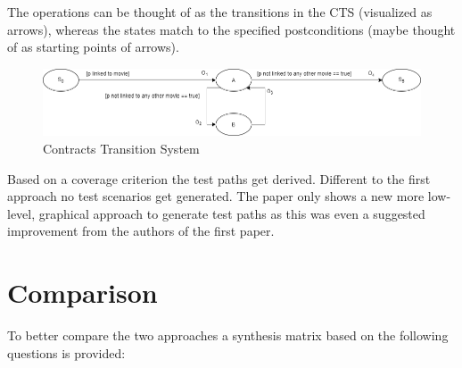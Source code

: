 The operations can be thought of as the transitions in the CTS (visualized as arrows), whereas the states match to the specified postconditions (maybe thought of as starting points of arrows).

\begin{figure}[h]
	\centering
	\includegraphics[width=\textwidth]{./images/cts.png}
	\caption{Contracts Transition System}
	\label{cts}
\end{figure}

Based on a coverage criterion the test paths get derived. Different to the first approach no test scenarios get generated. The paper only shows a new more low-level, graphical approach to generate test paths as this was even a suggested improvement from the authors of the first paper. 

\section{Comparison} \label{comparison}

To better compare the two approaches a synthesis matrix based on the following questions is provided:

